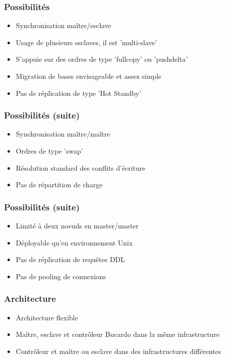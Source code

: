 \documentclass[utf8]{beamer}
\begin{document}
\begin{frame}
  \frametitle{Possibilités} 

  \begin{itemize}
  \item Synchronisation maître/esclave
  \item Usage de plusieurs esclaves, il est 'multi-slave'
  \item S'appuie sur des ordres de type 'fullcopy' ou 'pushdelta'
  \item Migration de bases envisageable et assez simple
  \item Pas de réplication de type 'Hot Standby'
  \end{itemize}
\end{frame}

\begin{frame}
  \frametitle{Possibilités (suite)} 

  \begin{itemize}
  \item Synchronisation maître/maître
  \item Ordres de type 'swap'
  \item Résolution standard des conflits d'écriture
  \item Pas de répartition de charge
  \end{itemize}
\end{frame}


\begin{frame}
  \frametitle{Possibilités (suite)} 

  \begin{itemize}
  \item Limité à deux noeuds en master/master
  \item Déployable qu'en environnement Unix
  \item Pas de réplication de requêtes DDL
  \item Pas de pooling de connexions
  \end{itemize}
\end{frame}


\begin{frame}
  \frametitle{Architecture} 

  \begin{itemize}
  \item Architecture flexible
  \item Maître, esclave et contrôleur Bucardo dans la même infrastructure
  \item Contrôleur et maître ou esclave dans des infrastructures différentes
  \end{itemize}
\end{frame}
\end{document}
